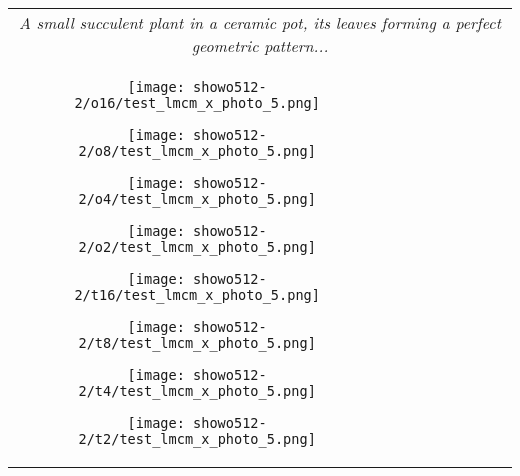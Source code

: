 \begin{figure*}[htbp]
\begin{tabular}{cccccccc}
        \multicolumn{8}{c}{\small \textit{A small succulent plant in a ceramic pot, its leaves forming a perfect geometric pattern...}} \\
        \vspace{0.1cm}





        \begin{minipage}{0.12\linewidth} 
            \centering
            \texttt{[image: showo512-2/o16/test\_lmcm\_x\_photo\_5.png]}
        \end{minipage} 
        \hspace{-0.15cm} %
        \begin{minipage}{0.12\linewidth} 
            \centering
            \texttt{[image: showo512-2/o8/test\_lmcm\_x\_photo\_5.png]}
        \end{minipage} 
        \hspace{-0.15cm}
        \begin{minipage}{0.12\linewidth} 
            \centering
            \texttt{[image: showo512-2/o4/test\_lmcm\_x\_photo\_5.png]}
        \end{minipage} 
        \hspace{-0.15cm}
        \begin{minipage}{0.12\linewidth} 
            \centering
            \texttt{[image: showo512-2/o2/test\_lmcm\_x\_photo\_5.png]}
        \end{minipage} 
        \hspace{0cm}
        \begin{minipage}{0.12\linewidth} 
            \centering
            \texttt{[image: showo512-2/t16/test\_lmcm\_x\_photo\_5.png]}
        \end{minipage} 
        \hspace{-0.15cm}
        \begin{minipage}{0.12\linewidth} 
            \centering
            \texttt{[image: showo512-2/t8/test\_lmcm\_x\_photo\_5.png]}
        \end{minipage} 
        \hspace{-0.15cm}
        \begin{minipage}{0.12\linewidth} 
            \centering
            \texttt{[image: showo512-2/t4/test\_lmcm\_x\_photo\_5.png]}
        \end{minipage} 
        \hspace{-0.15cm}
        \begin{minipage}{0.12\linewidth} 
            \centering
            \texttt{[image: showo512-2/t2/test\_lmcm\_x\_photo\_5.png]}
        \end{minipage} \\


\end{tabular}
\end{figure*}
